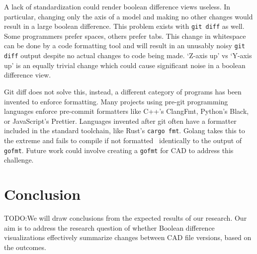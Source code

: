 \documentclass[sigconf,authorversion,nonacm]{acmart}
\begin{document}
A lack of standardization could render boolean difference views useless.
In particular, changing only the axis of a model and making no other changes would result in a large boolean difference.
This problem exists with \texttt{git diff} as well.
Some programmers prefer spaces, others prefer tabs.
This change in whitespace can be done by a code formatting tool and will result in an unusably noisy \texttt{git diff} output despite no actual changes to code being made.
`Z-axis up' vs `Y-axis up' is an equally trivial change which could cause significant noise in a boolean difference view.

Git diff does not solve this, instead, a different category of programs has been invented to enforce formatting.
Many projects using pre-git programming languages enforce pre-commit formatters like C++'s ClangFmt, Python's Black, or JavaScript's Prettier.
Languages invented after git often have a formatter included in the standard toolchain, like Rust's \texttt{cargo fmt}.
Golang takes this to the extreme and fails to compile if not formatted~\cite{golangfaq} identically to the output of \texttt{gofmt}.
Future work could involve creating a \texttt{gofmt} for CAD to address this challenge.

\section{Conclusion}

TODO:We will draw conclusions from the expected results of our research. Our aim is to address the research question of whether Boolean difference visualizations effectively summarize changes between CAD file versions, based on the outcomes.





\end{document}
